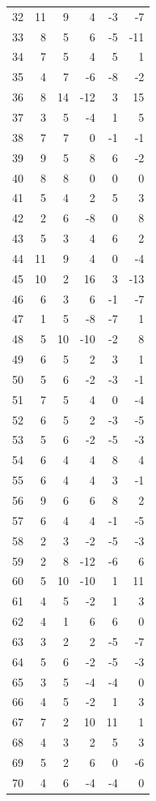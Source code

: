 \documentclass[11pt]{article}
\begin{document}
\begin{center}
\begin{longtable}{r r r r r r}
32 & 11 & 9 & 4 & -3 & -7\\
33 & 8 & 5 & 6 & -5 & -11\\
34 & 7 & 5 & 4 & 5 & 1\\
35 & 4 & 7 & -6 & -8 & -2\\
36 & 8 & 14 & -12 & 3 & 15\\
37 & 3 & 5 & -4 & 1 & 5\\
38 & 7 & 7 & 0 & -1 & -1\\
39 & 9 & 5 & 8 & 6 & -2\\
40 & 8 & 8 & 0 & 0 & 0\\
41 & 5 & 4 & 2 & 5 & 3\\
42 & 2 & 6 & -8 & 0 & 8\\
43 & 5 & 3 & 4 & 6 & 2\\
44 & 11 & 9 & 4 & 0 & -4\\
45 & 10 & 2 & 16 & 3 & -13\\
46 & 6 & 3 & 6 & -1 & -7\\
47 & 1 & 5 & -8 & -7 & 1\\
48 & 5 & 10 & -10 & -2 & 8\\
49 & 6 & 5 & 2 & 3 & 1\\
50 & 5 & 6 & -2 & -3 & -1\\
51 & 7 & 5 & 4 & 0 & -4\\
52 & 6 & 5 & 2 & -3 & -5\\
53 & 5 & 6 & -2 & -5 & -3\\
54 & 6 & 4 & 4 & 8 & 4\\
55 & 6 & 4 & 4 & 3 & -1\\
56 & 9 & 6 & 6 & 8 & 2\\
57 & 6 & 4 & 4 & -1 & -5\\
58 & 2 & 3 & -2 & -5 & -3\\
59 & 2 & 8 & -12 & -6 & 6\\
60 & 5 & 10 & -10 & 1 & 11\\
61 & 4 & 5 & -2 & 1 & 3\\
62 & 4 & 1 & 6 & 6 & 0\\
63 & 3 & 2 & 2 & -5 & -7\\
64 & 5 & 6 & -2 & -5 & -3\\
65 & 3 & 5 & -4 & -4 & 0\\
66 & 4 & 5 & -2 & 1 & 3\\
67 & 7 & 2 & 10 & 11 & 1\\
68 & 4 & 3 & 2 & 5 & 3\\
69 & 5 & 2 & 6 & 0 & -6\\
70 & 4 & 6 & -4 & -4 & 0\\

\end{longtable}
\end{center}
\end{document}
